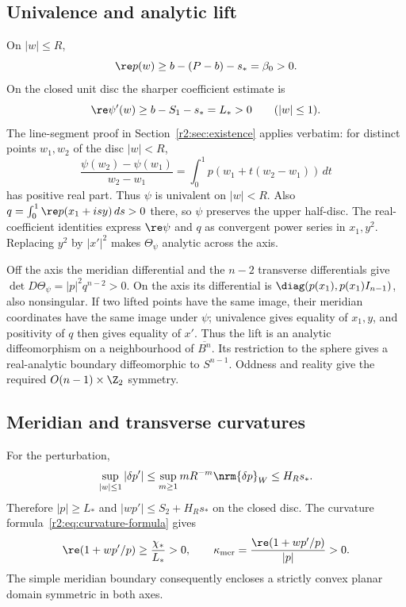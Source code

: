 \subsection{Univalence and analytic lift}\label{gd:sec:univalence}
On $|w|\le R$,
\[
 \re p(w)\ge b-(P-b)-s_*=\beta_0>0.
\]
On the closed unit disc the sharper coefficient estimate is
\begin{equation}\label{gd:eq:unit-disc-tangent}
 \re\psi'(w)\ge b-S_1-s_*=L_*>0\qquad(|w|\le1).
\end{equation}
The line-segment proof in Section~\ref{r2:sec:existence} applies verbatim:
for distinct points $w_1,w_2$ of the disc $|w|<R$,
\[
 \frac{\psi(w_2)-\psi(w_1)}{w_2-w_1}
 =\int_0^1p(w_1+t(w_2-w_1))\,dt
\]
has positive real part. Thus $\psi$ is univalent on $|w|<R$.
Also $q=\int_0^1\re p(x_1+isy)\,ds>0$ there, so $\psi$ preserves
the upper half-disc. The real-coefficient identities express
$\re\psi$ and $q$ as convergent power series in $x_1,y^2$.
Replacing $y^2$ by $|x'|^2$ makes $\Theta_\psi$ analytic across the axis.

Off the axis the meridian differential and the $n-2$ transverse
differentials give $\det D\Theta_\psi=|p|^2q^{n-2}>0$.
On the axis its differential is
$\diag(p(x_1),p(x_1)I_{n-1})$, also nonsingular.
If two lifted points have the same image, their meridian coordinates
have the same image under $\psi$; univalence gives equality of $x_1,y$,
and positivity of $q$ then gives equality of $x'$.
Thus the lift is an analytic diffeomorphism on a neighbourhood of
$\overline{B^n}$. Its restriction to the sphere gives a real-analytic
boundary diffeomorphic to $S^{n-1}$.
Oddness and reality give the required $O(n-1)\times\Z_2$ symmetry.

\subsection{Meridian and transverse curvatures}\label{gd:sec:curvatures}
For the perturbation,
\[
 \sup_{|w|\le1}|\delta p'|
 \le\sup_{m\ge1}mR^{-m}\nrm{\delta p}_W
 \le H_Rs_* .
\]
Therefore $|p|\ge L_*$ and $|wp'|\le S_2+H_Rs_*$ on the closed disc.
The curvature formula~\eqref{r2:eq:curvature-formula} gives
\begin{equation}\label{gd:eq:meridian-curvature}
 \re(1+wp'/p)\ge\frac{\chi_*}{L_*}>0,\qquad
 \kappa_{\rm mer}=\frac{\re(1+wp'/p)}{|p|}>0 .
\end{equation}
The simple meridian boundary consequently encloses a strictly convex
planar domain symmetric in both axes.

